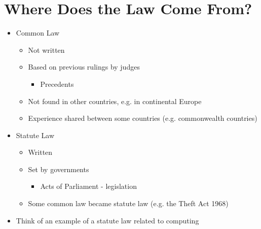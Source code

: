 \documentclass{article}
\begin{document}
\section{Where Does the Law Come From?}
\begin{itemize}
\item Common Law
\begin{itemize}
\item Not written
\item Based on previous rulings by judges
\begin{itemize}
\item Precedents
\end{itemize}
\item Not found in other countries, e.g. in continental Europe
\item Experience shared between some countries (e.g. commonwealth countries)
\end{itemize}

\item Statute Law 
\begin{itemize}
\item Written 
\item Set by governments
\begin{itemize}
\item Acts of Parliament - legislation
\end{itemize}
\item Some common law became statute law (e.g. the Theft Act 1968)
\end{itemize}

\item Think of an example of a statute law related to computing
\end{itemize}
\end{document}
